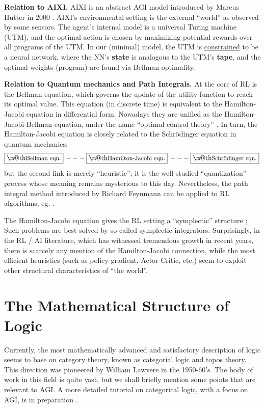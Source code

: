 \documentclass[orivec]{llncs}
\makeatletter
\renewcommand{\boxed}[1]{\fbox{\m@th$\displaystyle\scalebox{0.9}{#1}$} \,}
\makeatother
\begin{document}
\textbf{Relation to AIXI.}  AIXI is an abstract AGI model introduced by Marcus Hutter in 2000 \cite{Hutter2005}.  AIXI's environmental setting is the external ``world'' as observed by some sensors.  The agent's internal model is a universal Turing machine (UTM), and the optimal action is chosen by maximizing potential rewards over all programs of the UTM.  In our (minimal) model, the UTM is \uline{constrained} to be a neural network, where the NN's \textbf{state} is analogous to the UTM's \textbf{tape}, and the optimal weights (program) are found via Bellman optimality.

\textbf{Relation to Quantum mechanics and Path Integrals.}  At the core of RL is the Bellman equation, which governs the update of the utility function to reach its optimal value.  This equation (in discrete time) is equivalent to the Hamilton-Jacobi equation in differential form.  Nowadays they are unified as the Hamilton-Jacobi-Bellman equation, under the name ``optimal control theory'' \cite{Liberzon2012}.  In turn, the Hamilton-Jacobi equation is closely related to the Schr\"{o}dinger equation in quantum mechanics:
\begin{equation}
\boxed{\mbox{Bellman eqn.}} --- \boxed{\mbox{Hamilton-Jacobi eqn.}} --- \boxed{\mbox{Schr\"{o}dinger eqn.}}
\end{equation}
but the second link is merely ``heuristic'';  it is the well-studied ``quantization'' process whose meaning remains mysterious to this day.  Nevertheless, the path integral method introduced by Richard Feynmann can be applied to RL algorithms, eg. \cite{Kappen2007}.

The Hamilton-Jacobi equation gives the RL setting a ``symplectic'' structure \cite{};  Such problems are best solved by so-called symplectic integrators.  Surprisingly, in the RL / AI literature, which has witnessed tremendous growth in recent years, there is scarcely any mention of the Hamilton-Jacobi connection, while the most efficient heuristics (such as policy gradient, Actor-Critic, etc.) seem to exploit other structural characteristics of ``the world''.

\section{The Mathematical Structure of Logic}

Currently, the most mathematically advanced and satisfactory description of logic seems to base on category theory, known as categorial logic and topos theory.  This direction was pioneered by William Lawvere in the 1950-60's.  The body of work in this field is quite vast, but we shall briefly mention some points that are relevant to AGI.  A more detailed tutorial on categorical logic, with a focus on AGI, is in preparation \cite{Yan2021}.
\end{document}
